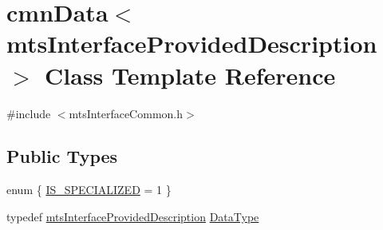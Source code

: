 \hypertarget{classcmn_data_3_01mts_interface_provided_description_01_4}{}\section{cmn\+Data$<$ mts\+Interface\+Provided\+Description $>$ Class Template Reference}
\label{classcmn_data_3_01mts_interface_provided_description_01_4}


{\ttfamily \#include $<$mts\+Interface\+Common.\+h$>$}

\subsection*{Public Types}
\begin{DoxyCompactItemize}
\item 
enum \{ \hyperlink{classcmn_data_3_01mts_interface_provided_description_01_4_aa317194f1fe540140960ff55f8e9558baed983d480ee0b5e51c09af1074a53ee1}{I\+S\+\_\+\+S\+P\+E\+C\+I\+A\+L\+I\+Z\+E\+D} = 1
 \}
\item 
typedef \hyperlink{classmts_interface_provided_description}{mts\+Interface\+Provided\+Description} \hyperlink{classcmn_data_3_01mts_interface_provided_description_01_4_af19cd473dc5065308646606d55246bc6}{Data\+Type}
\end{DoxyCompactItemize}
